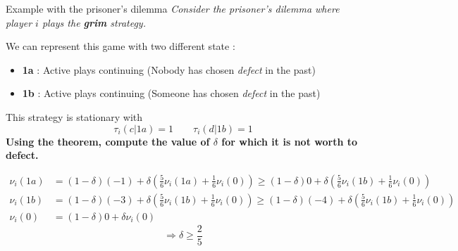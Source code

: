 \begin{frame}{Example with the prisoner's dilemma}
\textit{Consider the prisoner's dilemma where player $i$ plays the \textbf{grim} strategy.}

\pause
We can represent this game with two different state : 
\begin{itemize}
	\item \textbf{1a} : Active plays continuing (Nobody has chosen \textit{defect} in the past)
	\item \textbf{1b} : Active plays continuing (Someone has chosen \textit{defect} in the past)
\end{itemize}

\pause
This strategy is stationary with
$$ \tau_i(c|1a) = 1 \qquad \tau_i(d|1b) = 1$$
\pause
\textbf{\color{green}Using the theorem, compute the value of $\delta$ for which it is not worth to defect.}
\pause

\begin{small}
\begin{align*}
	\nu_i(1a) &= (1-\delta)(-1) + \delta \left( \frac{5}{6} \nu_i(1a) + \frac{1}{6} \nu_i(0) \right) \geq (1-\delta)0 + \delta \left( \frac{5}{6} \nu_i(1b) + \frac{1}{6} \nu_i(0) \right) \\
	\nu_i(1b) &= (1-\delta)(-3) + \delta \left( \frac{5}{6} \nu_i(1b) + \frac{1}{6} \nu_i(0) \right) \geq (1-\delta)(-4) + \delta \left( \frac{5}{6} \nu_i(1b) + \frac{1}{6} \nu_i(0) \right)	\\
	\nu_i(0) &= (1-\delta) 0 + \delta \nu_i(0)
\end{align*}
$$ \Rightarrow \delta \geq \frac{2}{5} $$
\end{small}

\end{frame}

